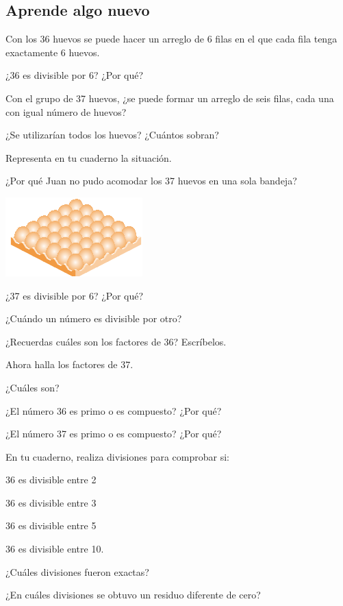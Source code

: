 \documentclass[10pt,twoside]{article}
\begin{document}
\subsection*{Aprende algo nuevo}
Con los 36 huevos se puede hacer un arreglo de 6 filas en el que cada fila tenga exactamente 6 huevos.
\begin{itemize}
\begin{minipage}{.55\textwidth}
\item  ¿36 es divisible por 6? ¿Por qué?
 \item  Con el grupo de 37 huevos, ¿se puede formar un arreglo
de seis filas, cada una con igual número de huevos?
 \item ¿Se utilizarían todos los huevos? ¿Cuántos sobran?
 \item Representa en tu cuaderno la situación.
 \item  ¿Por qué Juan no pudo acomodar los 37 huevos en una sola bandeja?
\end{minipage}\hfill
\begin{minipage}{.35\textwidth}
 \begin{center}
 \includegraphics{./Images/huevos_01.png}
\end{center}
\end{minipage}
\item ¿37 es divisible por 6? ¿Por qué?
\item ¿Cuándo un número es divisible por otro?
\item ¿Recuerdas cuáles son los factores de 36? Escríbelos.
\item Ahora halla los factores de 37.
\item ¿Cuáles son?
\item ¿El número 36 es primo o es compuesto? ¿Por qué?
\item ¿El número 37 es primo o es compuesto? ¿Por qué?
\end{itemize}
En tu cuaderno, realiza divisiones para comprobar si:
\begin{itemize}
\begin{multicols}{2}
 \item 36 es divisible entre 2
 \item 36 es divisible entre 3
 \item 36 es divisible entre 5
 \item 36 es divisible entre 10.
 \item ¿Cuáles divisiones fueron exactas?
 \item ¿En cuáles divisiones se obtuvo un residuo diferente de cero?
 \end{multicols}
\end{itemize}
\end{document}
